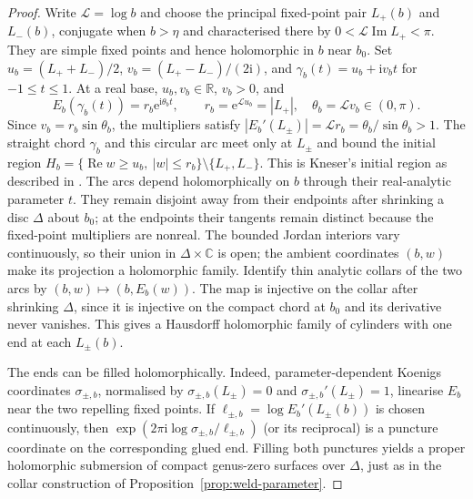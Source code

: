 \documentclass[11pt]{amsart}
\theoremstyle{definition}
\newcommand{\eee}{\mathrm{e}}
\newcommand{\ii}{\mathrm{i}}
\begin{document}
\begin{proof}
Write $\mathcal L=\log b$ and choose the principal fixed-point pair $L_+(b)$ and
$L_-(b)$, conjugate when $b>\eta$ and characterised there by
$0<\mathcal L\operatorname{Im}L_+<\pi$.  They are simple fixed
points and hence holomorphic in $b$ near $b_0$.  Set
$u_b=(L_++L_-)/2$, $v_b=(L_+-L_-)/(2\ii)$, and
$\gamma_b(t)=u_b+\ii v_b t$ for $-1\le t\le1$.
At a real base, $u_b,v_b\in\mathbb R$, $v_b>0$, and
\[
 E_b(\gamma_b(t))=r_b\eee^{\ii\theta_b t},\qquad
 r_b=\eee^{\mathcal L u_b}=|L_+|,\quad
 \theta_b=\mathcal L v_b\in(0,\pi).
\]
Since $v_b=r_b\sin\theta_b$, the multipliers satisfy
$|E_b'(L_\pm)|=\mathcal L r_b=\theta_b/\sin\theta_b>1$.
The straight chord $\gamma_b$ and this circular arc meet only at
$L_\pm$ and bound the initial region
$H_b=\{\operatorname{Re}w\ge u_b,\ |w|\le r_b\}\setminus\{L_+,L_-\}$.
This is Kneser's initial region as described in
\cite[\S4, Lem.~4]{TrappmannKouznetsov2011}.
The arcs depend holomorphically on $b$ through their real-analytic
parameter $t$.  They remain disjoint away from their endpoints after
shrinking a disc $\Delta$ about $b_0$; at the endpoints their tangents
remain distinct because the fixed-point multipliers are nonreal.
The bounded Jordan interiors vary continuously, so their union in
$\Delta\times\mathbb C$ is open; the ambient coordinates $(b,w)$ make
its projection a holomorphic family.  Identify thin analytic collars
of the two arcs by
$(b,w)\mapsto(b,E_b(w))$.  The map is injective on the collar after
shrinking $\Delta$, since it is injective on the compact chord at
$b_0$ and its derivative never vanishes.  This gives a Hausdorff
holomorphic family of cylinders with one end at each $L_\pm(b)$.

The ends can be filled holomorphically.  Indeed, parameter-dependent
Koenigs coordinates $\sigma_{\pm,b}$, normalised by
$\sigma_{\pm,b}(L_\pm)=0$ and $\sigma_{\pm,b}'(L_\pm)=1$,
linearise $E_b$ near the two repelling fixed points.  If
$\ell_{\pm,b}=\log E_b'(L_\pm(b))$ is
chosen continuously, then
$\exp(2\pi\ii\log\sigma_{\pm,b}/\ell_{\pm,b})$ (or its reciprocal)
is a puncture coordinate on the corresponding glued end.  Filling
both punctures yields a proper holomorphic submersion of compact
genus-zero surfaces over $\Delta$, just as in the collar construction
of Proposition~\ref{prop:weld-parameter}.


\end{proof}
\end{document}
